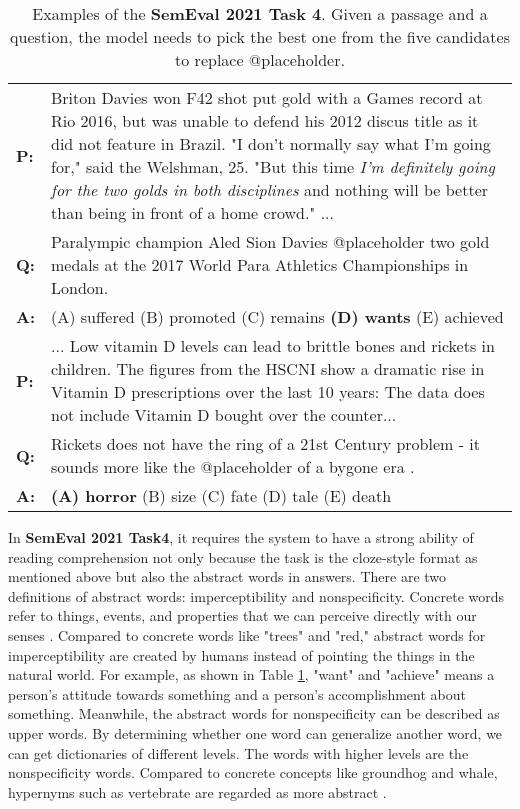 \documentclass[11pt,a4paper]{article}
\begin{document}
\begin{table}[htb]
\centering
\begin{tabularx}{0.48\textwidth}{p{0.1cm} X}
\toprule[1pt]
\textbf{P:} & Briton Davies won F42 shot put gold with a Games record at Rio 2016, but was unable to defend his 2012 discus title as it did not feature in Brazil. "I don't normally say what I'm going for," said the Welshman, 25. "But this time \textit{I'm definitely going for the two golds in both disciplines} and nothing will be better than being in front of a home crowd." ... \\
\textbf{Q:} & Paralympic champion Aled Sion Davies @placeholder two gold medals at the 2017 World Para Athletics Championships in London. \\
\textbf{A:} & (A) suffered (B) promoted (C) remains \textbf{(D) wants} (E) achieved \\
\hline

\textbf{P:} &... Low vitamin D levels can lead to brittle bones and rickets in children. The figures from the HSCNI show a dramatic rise in Vitamin D prescriptions over the last 10 years: The data does not include Vitamin D bought over the counter...\\
\textbf{Q:}&Rickets does not have the ring of a 21st Century problem - it sounds more like the @placeholder of a bygone era .\\
\textbf{A:} & \textbf{(A) horror} (B) size (C) fate (D) tale (E) death\\
\toprule[1pt]
\end{tabularx}
\caption{\label{font-table} Examples of the \textbf{SemEval 2021 Task 4}. 
Given a passage and a question, the model needs to pick the best one from the five candidates to replace @placeholder. }
\label{tb:task}
\end{table}

In \textbf{SemEval 2021 Task4}, it requires the system to have a strong ability of reading comprehension not only because the task is the cloze-style format as mentioned above but also the abstract words in answers. 
There are two definitions of abstract words: imperceptibility and nonspecificity.
Concrete words refer to things, events, and properties that we can perceive directly with our senses \cite{spreen_parameters_1966, turney_literal_2011}.
Compared to concrete words like "trees" and "red," abstract words for imperceptibility are created by humans instead of pointing the things in the natural world.
For example, as shown in Table \ref{tb:task}, "want" and "achieve" means a person's attitude towards something and a person's accomplishment about something. 
Meanwhile, the abstract words for nonspecificity can be described as upper words.
By determining whether one word can generalize another word, we can get dictionaries of different levels. 
The words with higher levels are the nonspecificity words. 
Compared to concrete concepts like groundhog and whale, hypernyms such as vertebrate are regarded as more abstract \cite{changizi_economically_2008}.
\end{document}
